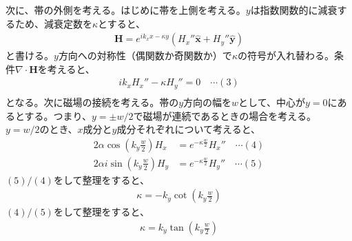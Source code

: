 \documentclass[a4paper,11pt,dvipdfmx]{jsarticle}
\begin{document}
\begin{enumerate}
        次に、帯の外側を考える。はじめに帯を上側を考える。$y$は指数関数的に減衰するため、減衰定数を$\kappa$とすると、
        \begin{align*}
          \mathbf{H} = e^{i k_x x - \kappa y}\left( H_x'' \hat{\boldsymbol{x}} + H_y'' \hat{\boldsymbol{y}} \right)
        \end{align*}
        と書ける。$y$方向への対称性（偶関数か奇関数か）で$\kappa$の符号が入れ替わる。条件$\nabla \cdot \mathbf{H}$を考えると、
        \begin{align*}
          i k_x H_x'' - \kappa H_y'' = 0 \quad \cdots (3) \\
        \end{align*}
        となる。次に磁場の接続を考える。帯の$y$方向の幅を$w$として、中心が$y = 0$にあるとする。つまり、$y = \pm w / 2$で磁場が連続であるときの場合を考える。
        $y = w / 2$のとき、$x成分とy$成分それぞれについて考えると、
        \begin{align*}
          2 \alpha \cos \left( k_y \frac{w}{2} \right)H_x &= e^{- \kappa \frac{w}{2}} H_x'' \quad \cdots (4) \\
          2 \alpha i \sin \left( k_y \frac{w}{2} \right)H_y &= e^{- \kappa \frac{w}{2}} H_y'' \quad \cdots (5)
        \end{align*}
        $(5)/(4)$をして整理をすると、
        \begin{align*}
          \kappa = - k_y \cot \left( k_y \frac{w}{2} \right)
        \end{align*}
        $(4)/(5)$をして整理をすると、
        \begin{align*}
          \kappa = k_y \tan \left( k_y \frac{w}{2} \right)
        \end{align*}

    \end{enumerate}
    
\end{document}
